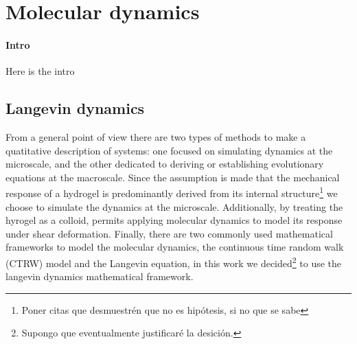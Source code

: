 \section{Molecular dynamics}

\paragraph{Intro} Here is the intro

\subsection{Langevin dynamics}

From a general point of view there are two types of methods to make a quatitative description of systems: one focused on simulating dynamics at the microscale, and the other dedicated to deriving or establishing evolutionary equations at the macroscale\citep{wangMultiscaleModelingSimulation2025}.
Since the assumption is made that the mechanical response of a hydrogel is predominantly derived from its internal structure\footnote{Poner citas que desmuestrén que no es hipótesis, si no que se sabe} we choose to simulate the dynamics at the microscale.
Additionally, by treating the hyrogel as a colloid, permits applying molecular dynamics to model its response under shear deformation. 
Finally, there are two commonly used mathematical frameworks to model the molecular dynamics, the continuous time random walk (CTRW) model and the Langevin equation\citep{wangMultiscaleModelingSimulation2025}, in this work we decided\footnote{Supongo que eventualmente justificaré la desición.} to use the langevin dynamics mathematical framework.

